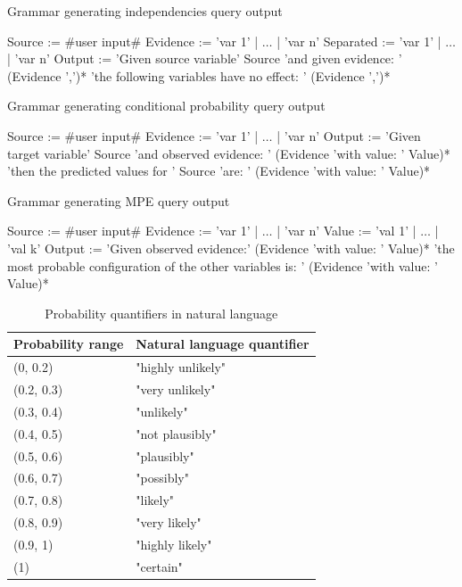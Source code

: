 \begin{algorithm}[htp!]
	\caption{Grammar generating independencies query output}
	\label{alg:nl-independencies}
	\begin{algorithmic}[1]
		\State Source := \#user input\#
		\State Evidence := 'var 1' | $\ldots$ |  'var n'
		\State Separated := 'var 1' | $\ldots$ |  'var n'
		\State Output := 'Given source variable' Source 'and given evidence: '  (Evidence ',')* 'the following variables have no effect: ' (Evidence ',')*
	\end{algorithmic}
\end{algorithm}

\begin{algorithm}[htp!]
	\caption{Grammar generating conditional probability query output}
	\label{alg:nl-conditional}
	\begin{algorithmic}[1]
		\State Source := \#user input\#
		\State Evidence := 'var 1' | $\ldots$ |  'var n'
		\State Output := 'Given target variable' Source 'and observed evidence: ' (Evidence 'with value: ' Value)* 'then the predicted values for ' Source 'are: ' (Evidence 'with value: ' Value)*
	\end{algorithmic}
\end{algorithm}

\begin{algorithm}[htp!]
	\caption{Grammar generating MPE query output}
	\label{alg:nl-mpe}
	\begin{algorithmic}[1]
		\State Source := \#user input\#
		\State Evidence := 'var 1' | $\ldots$ |  'var n'
		\State Value := 'val 1' | $\ldots$ |  'val k'
		\State Output := 'Given observed evidence:' (Evidence 'with value: ' Value)* 'the most probable configuration of the other variables is: ' (Evidence 'with value: ' Value)*
	\end{algorithmic}
\end{algorithm}

\begin{table}[htbp]
\centering
\caption{Probability quantifiers in natural language}
\begin{tabularx}{0.5\textwidth}{ X X }
\toprule 
Probability range & Natural language quantifier \\
\midrule 
(0, 0.2) &  "highly unlikely" \\
(0.2, 0.3) & "very unlikely" \\
(0.3, 0.4) & "unlikely" \\
(0.4, 0.5) & "not plausibly" \\
(0.5, 0.6) & "plausibly" \\
(0.6, 0.7) & "possibly" \\
(0.7, 0.8) & "likely" \\
(0.8, 0.9) & "very likely" \\
(0.9, 1) &  "highly likely" \\
(1) &  "certain" \\
\bottomrule
\end{tabularx}
\label{tab:naturallanguageprobabilities}
\end{table}

